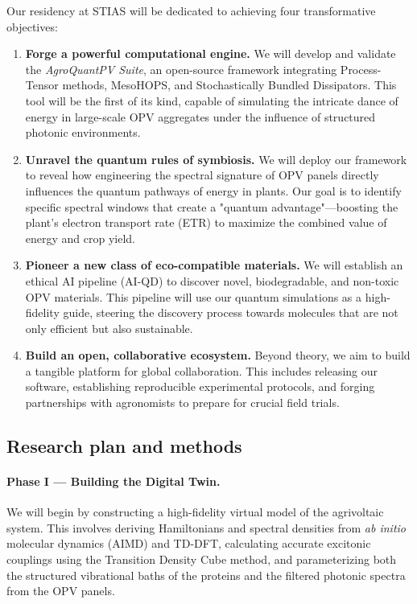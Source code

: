 \documentclass[11pt,a4paper]{article}
\begin{document}
Our residency at STIAS will be dedicated to achieving four transformative objectives:
\begin{enumerate}
\item \textbf{Forge a powerful computational engine.} We will develop and validate the \textit{AgroQuantPV Suite}, an open-source framework integrating Process-Tensor methods, MesoHOPS, and Stochastically Bundled Dissipators. This tool will be the first of its kind, capable of simulating the intricate dance of energy in large-scale OPV aggregates under the influence of structured photonic environments.

\item \textbf{Unravel the quantum rules of symbiosis.} We will deploy our framework to reveal how engineering the spectral signature of OPV panels directly influences the quantum pathways of energy in plants. Our goal is to identify specific spectral windows that create a "quantum advantage"—boosting the plant's electron transport rate (ETR) to maximize the combined value of energy and crop yield.

\item \textbf{Pioneer a new class of eco-compatible materials.} We will establish an ethical AI pipeline (AI-QD) to discover novel, biodegradable, and non-toxic OPV materials. This pipeline will use our quantum simulations as a high-fidelity guide, steering the discovery process towards molecules that are not only efficient but also sustainable.

\item \textbf{Build an open, collaborative ecosystem.} Beyond theory, we aim to build a tangible platform for global collaboration. This includes releasing our software, establishing reproducible experimental protocols, and forging partnerships with agronomists to prepare for crucial field trials.
\end{enumerate}

\subsection*{Research plan and methods}

\paragraph{Phase I — Building the Digital Twin.} We will begin by constructing a high-fidelity virtual model of the agrivoltaic system. This involves deriving Hamiltonians and spectral densities from \textit{ab initio} molecular dynamics (AIMD) and TD-DFT, calculating accurate excitonic couplings using the Transition Density Cube method, and parameterizing both the structured vibrational baths of the proteins and the filtered photonic spectra from the OPV panels.
\end{document}

